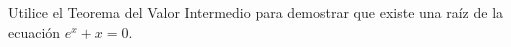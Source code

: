 \item Utilice el Teorema del Valor Intermedio para demostrar que existe una raíz de la ecuación $e^x + x = 0$.
